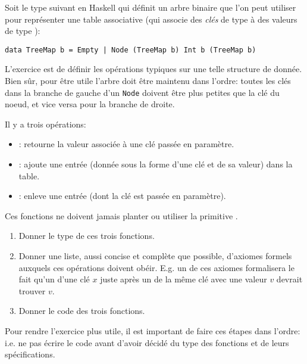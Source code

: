 \begin{Exercise}[title={Table associative}]
  \label{ex:treemap}
Soit le type suivant en Haskell qui définit un arbre binaire que l'on peut
utiliser pour représenter une table associative (qui associe des \emph{clés}
de type  à des valeurs de type ):
\begin{verbatim}
data TreeMap b = Empty | Node (TreeMap b) Int b (TreeMap b)
\end{verbatim}
L'exercice est de définir les opérations typiques sur une telle
structure de donnée.  Bien sûr, pour être utile l'arbre doit être
maintenu dans l'ordre: toutes les clés dans la branche de gauche d'un
\texttt{Node} doivent être plus petites que la clé du noeud, et
vice versa pour la branche de droite.

Il y a trois opérations:
\begin{itemize}
\item {}: retourne la valeur associée à une clé passée
  en paramètre.
\item {}: ajoute une entrée (donnée sous la forme
  d'une clé et de sa valeur) dans la table.
\item {}: enleve une entrée (dont la clé est passée
  en paramètre).
\end{itemize}

Ces fonctions ne doivent jamais planter ou utiliser la primitive .

\begin{enumerate}
\item Donner le type de ces trois fonctions.
\item Donner une liste, aussi concise et complète que possible,
  d'axiomes formels auxquels ces opérations doivent obéir.  E.g. un de
  ces axiomes formalisera le fait qu'un  d'une clé
  $x$ juste après un  de la même clé avec une
  valeur $v$ devrait trouver $v$.
\item Donner le code des trois fonctions.
\end{enumerate}
Pour rendre l'exercice plus utile, il est important de faire ces étapes dans
l'ordre: i.e. ne pas écrire le code avant d'avoir décidé du type
des fonctions et de leurs spécifications.
\end{Exercise}

\begin{Answer}[ref={ex:treemap}]
\end{Answer}